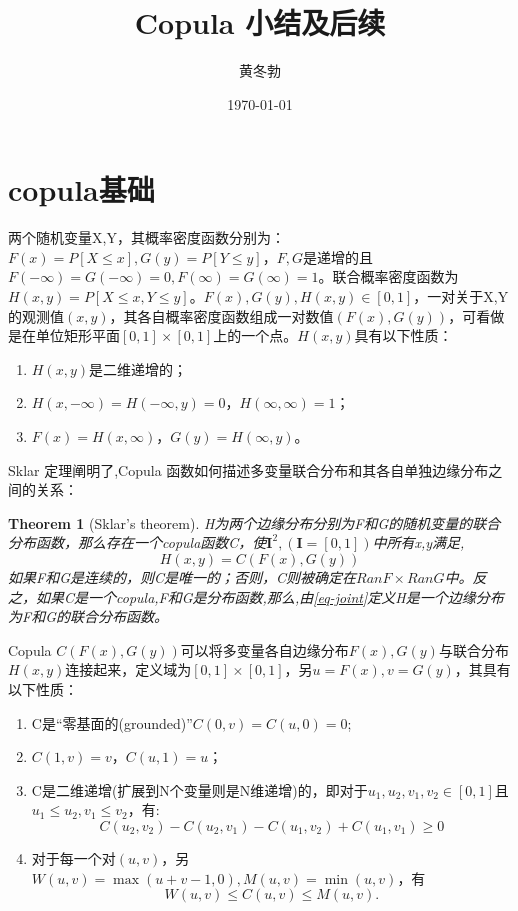 \documentclass[UTF8]{ctexart}
\title{\heiti Copula 小结及后续}
\author{\kaishu 黄冬勃}
\date{\today}
\newtheorem{theorem}{Theorem}[subsection]
\begin{document}
\maketitle

\section{copula基础}
两个随机变量X,Y，其概率密度函数分别为：$F(x) = P[X\leq x], G(y) = P[Y \leq y]$，$F,G$是递增的且$F(-\infty)=G(-\infty)=0,F(\infty)=G(\infty)=1$。联合概率密度函数为$H(x,y) = P[X\leq x, Y\leq y]$。$F(x),G(y),H(x,y) \in [0,1]$，一对关于X,Y的观测值$(x,y)$，其各自概率密度函数组成一对数值$(F(x),G(y))$，可看做是在单位矩形平面$[0,1]\times[0,1]$上的一个点。$H(x,y)$具有以下性质：
\begin{enumerate}[1.]
    \item $H(x,y)$是二维递增的；
    \item $H(x,-\infty) = H(-\infty,y) = 0$，$H(\infty,\infty)=1$；
    \item $F(x) = H(x,\infty)$，$G(y) = H(\infty,y)$。
\end{enumerate}

Sklar 定理阐明了,Copula 函数如何描述多变量联合分布和其各自单独边缘分布之间的关系\cite{Bill2000An}：
\begin{theorem}[Sklar's theorem]
    H为两个边缘分布分别为F和G的随机变量的联合分布函数，那么存在一个copula函数C，使$\mathbf{I}^2, (\mathbf{I}=[0,1])$中所有x,y满足,
    \begin{equation}
        H(x,y) = C(F(x),G(y))
        \label{eq-joint}
    \end{equation}
    如果F和G是连续的，则C是唯一的；否则，C则被确定在$RanF\times RanG$中。反之，如果C是一个copula,F和G是分布函数,那么,由\cref{eq-joint}定义H是一个边缘分布为F和G的联合分布函数。
    \label{thr-sklar}
\end{theorem}
Copula $C(F(x),G(y))$可以将多变量各自边缘分布$F(x),G(y)$与联合分布$H(x,y)$连接起来，定义域为$[0,1]\times[0,1]$，另$u=F(x),v=G(y)$，其具有以下性质：
\begin{enumerate}[1.]
    \item C是``零基面的(grounded)''$C(0,v)=C(u,0)=0$;
    \item $C(1,v) = v$，$C(u,1)=u$；
    \item C是二维递增(扩展到N个变量则是N维递增)的，即对于$u_1,u_2,v_1,v_2 \in [0,1]$且$u_1 \leq u_2, v_1 \leq v_2$，有:
        \begin{equation*}
            C(u_2,v_2) - C(u_2,v_1) - C(u_1,v_2) + C(u_1,v_1) \geq 0
        \end{equation*}
    \item 对于每一个对$(u,v)$，另$W(u,v) = \max(u+v-1,0),M(u,v) = \min(u,v)$，有
        \begin{equation}
            W(u,v) \leq C(u,v) \leq M(u,v).
            \label{eq-domain}
        \end{equation}
\end{enumerate}
\end{document}
